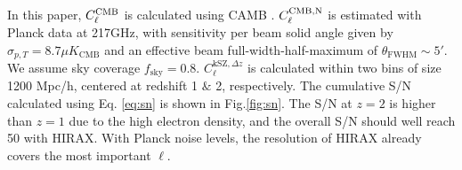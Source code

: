 In this paper, $C_\ell^\mathrm{CMB}$ is calculated using CAMB \cite{CAMB}. $C_\ell^\mathrm{CMB,N}$ is estimated with Planck data \cite{Planck2015} at 217GHz, with sensitivity per beam solid angle given by $\sigma_{p,T}=8.7\mu K_\mathrm{CMB}$ and an effective beam full-width-half-maximum of $\theta_\mathrm{FWHM}\sim 5'$. 
We assume sky coverage $f_\mathrm{sky}=0.8$. $C_\ell^{\mathrm{kSZ},\Delta z}$ is calculated within two bins of size 1200 Mpc/h, centered at redshift 1 $\&$ 2, respectively. 
The cumulative S/N calculated using Eq. \eqref{eq:sn} is shown in Fig.\ref{fig:sn}. The S/N at $z=2$ is higher than $z=1$ due to the high electron density, and the overall S/N should well reach 50 with HIRAX. With Planck noise levels, the resolution of HIRAX already covers the most important $\ell$. 

